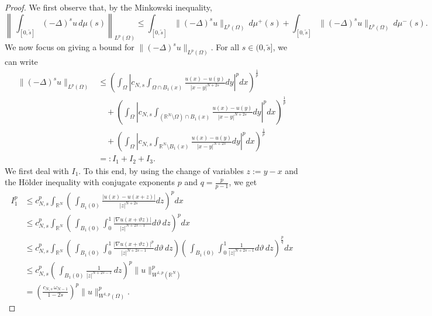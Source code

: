 \documentclass[12pt,a4paper,intlimits,sumlimits]{amsart}
\def \R {\mathbb{R}}
\theoremstyle{definition}
\theoremstyle{plain}
\numberwithin{equation}{section}
\renewcommand{\leq}{\leqslant}
\begin{document}
\begin{proof}
We first observe that, by the Minkowski inequality,
\begin{equation}\label{zserfgyuhnjkop1}
\left\|\,\int_{[0,\widetilde s]}(-\Delta)^s u\,d\mu(s) \right\|_{L^p(\Omega)}\leq \int_{[0,\widetilde s]}\|(-\Delta)^s u\|_{L^p(\Omega)}\,d\mu^+(s)+\int_{[0,\widetilde s]}\|(-\Delta)^s u\|_{L^p(\Omega)}\,d\mu^-(s).
\end{equation}
We now focus on giving a bound for $\|(-\Delta)^s u\|_{L^p(\Omega)}$.  For all $s\in (0, \widetilde s]$,  we can write
\begin{equation}\label{zserfgyuhnjkop2}
\begin{aligned}
\|(-\Delta)^s u\|_{L^p(\Omega)}&\leq \left(\int_\Omega\left|c_{N,s}\int_{\Omega\cap B_1(x)}\frac{u(x)-u(y)}{|x-y|^{N+2s}}dy\right|^p dx\right)^\frac{1}{p} \\
&\quad +\left(\int_\Omega\left|c_{N,s}\int_{(\R^N\setminus \Omega)\cap B_1(x)}\frac{u(x)-u(y)}{|x-y|^{N+2s}}dy\right|^p dx\right)^\frac{1}{p} \\
&\quad+\left(\int_\Omega\left|c_{N,s}\int_{\R^N\setminus B_1(x)}\frac{u(x)-u(y)}{|x-y|^{N+2s}}dy\right|^p dx\right)^\frac{1}{p} \\
&=:I_1+I_2+I_3.
\end{aligned}
\end{equation}
We first deal with $I_1$. 
To this end, by using the change of variables $z:=y-x$ and the H\"older inequality with conjugate exponents $p$ and $q=\frac{p}{p-1}$, we get
\begin{equation}\label{zserfgyuhnjkop3}
\begin{aligned}
I_1^p&\leq c_{N,s}^p\int_{\R^N}\left(\,\int_{B_1(0)}\frac{|u(x)-u(x+z)|}{|z|^{N+2s}}dz\right)^pdx \\
&\leq c_{N,s}^p\int_{\R^N}\left(\,\int_{B_1(0)}\int_0^1\frac{|\nabla u(x+\vartheta z)|}{|z|^{N+2s-1}}d\vartheta\,dz\right)^p dx \\
&\leq c_{N,s}^p \int_{\R^N}\left(\,\int_{B_1(0)}\int_0^1\frac{|\nabla u(x+\vartheta z)|^p}{|z|^{N+2s-1}}d\vartheta\,dz\right)\left(\,\int_{B_1(0)}\int_0^1\frac{1}{|z|^{N+2s-1}}d\vartheta\,dz\right)^\frac{p}{q} dx \\
&\leq c_{N,s}^p\left(\,\int_{B_1(0)}\frac{1}{|z|^{N+2s-1}}\,dz\right)^p \|u\|_{W^{1,p}(\R^N)}^p \\
&= \left(\frac{c_{N,s}\,\omega_{N-1}}{1-2s}\right)^p\|u\|_{W^{1,p}(\Omega)}^p.
\end{aligned}
\end{equation}


\end{proof}
\end{document}
